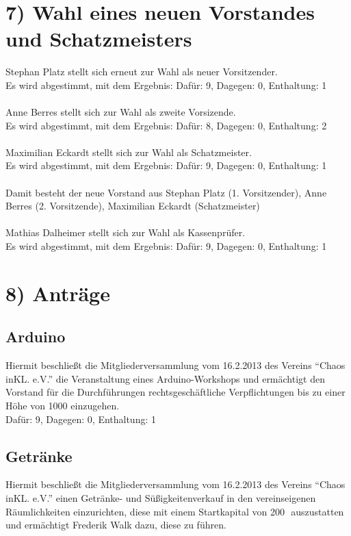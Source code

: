 \documentclass{scrartcl}
\begin{document}
\section*{7) Wahl eines neuen Vorstandes und Schatzmeisters}
Stephan Platz stellt sich erneut zur Wahl als neuer Vorsitzender.\\
Es wird abgestimmt, mit dem Ergebnis: Dafür: 9, Dagegen: 0, Enthaltung: 1\\
\\
Anne Berres stellt sich zur Wahl als zweite Vorsizende.\\
Es wird abgestimmt, mit dem Ergebnis: Dafür: 8, Dagegen: 0, Enthaltung: 2\\
\\
Maximilian Eckardt stellt sich zur Wahl als Schatzmeister.\\
Es wird abgestimmt, mit dem Ergebnis: Dafür: 9, Dagegen: 0, Enthaltung: 1\\
\\
Damit besteht der neue Vorstand aus Stephan Platz (1. Vorsitzender), Anne Berres (2. Vorsitzende), Maximilian Eckardt (Schatzmeister)\\
\\
Mathias Dalheimer stellt sich zur Wahl als Kassenprüfer.\\
Es wird abgestimmt, mit dem Ergebnis: Dafür: 9, Dagegen: 0, Enthaltung: 1\\

\section*{8) Anträge}
\subsection*{Arduino}

Hiermit beschließt die Mitgliederversammlung vom 16.2.2013 des
Vereins ``Chaos inKL. e.V.'' die Veranstaltung eines Arduino-Workshops
und ermächtigt den Vorstand für die Durchführungen
rechtsgeschäftliche Verpflichtungen bis zu einer Höhe von 1000\officialeuro\,\,einzugehen.\\

Dafür: 9, Dagegen: 0, Enthaltung: 1

\subsection*{Getränke}

Hiermit beschließt die Mitgliederversammlung vom 16.2.2013 des
Vereins ``Chaos inKL. e.V.'' einen Getränke- und Süßigkeitenverkauf in
den vereinseigenen Räumlichkeiten einzurichten, diese mit einem
Startkapital von 200\officialeuro\,\, auszustatten und ermächtigt Frederik Walk dazu,
diese zu führen.\\
\end{document}
